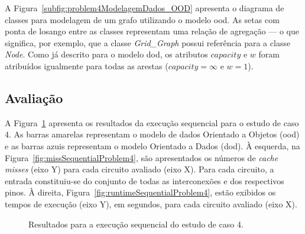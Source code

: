 A Figura~\ref{subfig:problem4ModelagemDados_OOD} apresenta o diagrama de classes para modelagem de um grafo utilizando o modelo \ac{ood}.
As setas com ponta de losango entre as classes representam  uma relação de agregação --- o que significa, por exemplo, que a classe \textit{Grid\_Graph} possui referência para a classe \textit{Node}.
Como já descrito para o modelo \ac{dod}, os atributos $capacity$ e $w$ foram atribuídos igualmente para todas as arestas ($capacity = \infty$ e $w = 1$).


\subsection{Avaliação}

A Figura~\ref{fig:resultsProblem4sequencial} apresenta os resultados da execução sequencial para o estudo de caso 4.
As barras amarelas representam o modelo de dados Orientado a Objetos (\ac{ood}) e as barras azuis representam o modelo Orientado a Dados (\ac{dod}).
À esquerda, na Figura~\ref{fig:missSequentialProblem4}, são apresentados os números de  \textit{cache misses} (eixo Y) para cada circuito avaliado (eixo X).
Para cada circuito, a entrada constituiu-se do conjunto de todas as interconexões e dos respectivos pinos.
À direita, Figura~\ref{fig:runtimeSequentialProblem4}, estão exibidos os tempos de execução (eixo Y), em segundos, para cada circuito avaliado (eixo X).

\begin{figure}[ht]
    \centering
    \caption{Resultados para a execução sequencial do estudo de caso 4.}
    \label{fig:resultsProblem4sequencial}
\end{figure}

